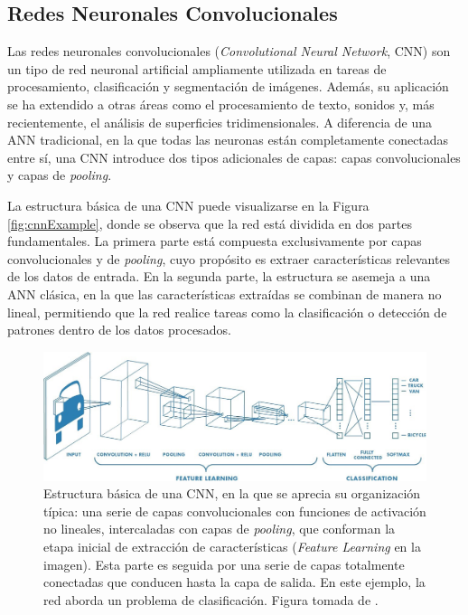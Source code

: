 \subsection{Redes Neuronales Convolucionales}
\label{section2:cnn}
Las redes neuronales convolucionales (\textit{Convolutional Neural Network}, CNN) \cite{lecun_backpropagation_1989, leCUM_CNN} son un tipo de red neuronal artificial ampliamente utilizada en tareas de procesamiento, clasificación y segmentación de imágenes. Además, su aplicación se ha extendido a otras áreas como el procesamiento de texto, sonidos y, más recientemente, el análisis de superficies tridimensionales. A diferencia de una ANN tradicional, en la que todas las neuronas están completamente conectadas entre sí, una CNN introduce dos tipos adicionales de capas: capas convolucionales y capas de \textit{pooling}.

La estructura básica de una CNN puede visualizarse en la Figura \ref{fig:cnnExample}, donde se observa que la red está dividida en dos partes fundamentales. La primera parte está compuesta exclusivamente por capas convolucionales y de \textit{pooling}, cuyo propósito es extraer características relevantes de los datos de entrada. En la segunda parte, la estructura se asemeja a una ANN clásica, en la que las características extraídas se combinan de manera no lineal, permitiendo que la red realice tareas como la clasificación o detección de patrones dentro de los datos procesados.

\begin{figure}[h]
    \centering
    \includegraphics[width=\linewidth]{figures/2_theory/cnnExample.jpeg}
    \caption[Estructura básica de una CNN]{Estructura básica de una CNN, en la que se aprecia su organización típica: una serie de capas convolucionales con funciones de activación no lineales, intercaladas con capas de \textit{pooling}, que conforman la etapa inicial de extracción de características (\textit{Feature Learning} en la imagen). Esta parte es seguida por una serie de capas totalmente conectadas que conducen hasta la capa de salida. En este ejemplo, la red aborda un problema de clasificación. Figura tomada de \cite{prabhu_understanding_2019}.}
\end{figure}

